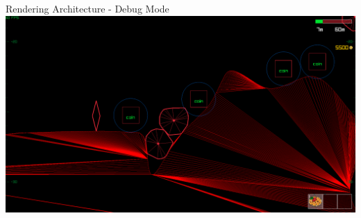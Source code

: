 \begin{frame}{Rendering Architecture - Debug Mode}
    \includegraphics[width=\textwidth]{../figures/Debug-Mode.png}
\end{frame}